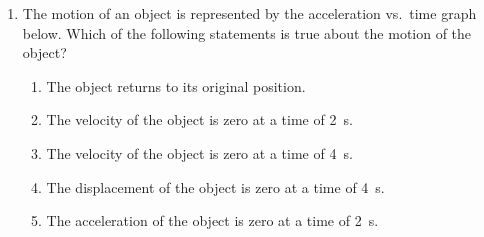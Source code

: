 \documentclass{../../oss-apphys}
\begin{document}
\begin{multicols}{2}
\begin{enumerate}[resume,leftmargin=18pt]
  \item The motion of an object is represented by the acceleration vs.\ time
    graph below. Which of the following statements is true about the
    motion of the object?
    \begin{center}
    \end{center}
    \begin{enumerate}[noitemsep,topsep=0pt,leftmargin=18pt,label=(\Alph*)]
    \item The object returns to its original position.
    \item The velocity of the object is zero at a time of \SI{2}{\second}.
    \item The velocity of the object is zero at a time of \SI{4}{\second}.
    \item The displacement of the object is zero at a time of \SI{4}{\second}.
    \item The acceleration of the object is zero at a time of \SI{2}{\second}.
    \end{enumerate}
   
  \end{enumerate}
\end{multicols}
\end{document}
